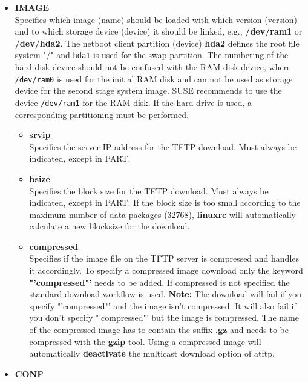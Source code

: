 \begin{itemize}
    \item \textbf{IMAGE}\\
        Specifies which image (name) should be loaded with which
        version (version) and to which storage device (device) it
        should be linked, e.g., \textbf{/dev/ram1} or
        \textbf{/dev/hda2}. The netboot client partition (device)
        \textbf{hda2} defines the root file system "/" and \texttt{hda1}
        is used for the swap partition. The numbering of the hard disk
        device should not be confused with the RAM disk device,
        where \texttt{/dev/ram0} is used for the initial RAM disk and
        can not be used as storage device for the second stage system image.
        SUSE recommends to use the device \texttt{/dev/ram1} for the
        RAM disk. If the hard drive is used, a corresponding partitioning
        must be performed.
        \begin{itemize}
        \item \textbf{srvip}\\
        Specifies the server IP address for the TFTP download.
        Must always be indicated, except in PART.
        \item \textbf{bsize}\\
        Specifies the block size for the TFTP download. Must always
        be indicated, except in PART. If the block size is too small
        according to the maximum number of data packages (32768),
        \textbf{linuxrc} will automatically calculate a new blocksize for
        the download.
        \item \textbf{compressed}\\
        Specifies if the image file on the TFTP server is compressed and
        handles it accordingly. To specify a compressed image download only
        the keyword \textbf{"'compressed"'} needs to be added. If compressed
        is not specified the standard download workflow is used. \textbf{Note:}
        The download will fail if you specify "'compressed"' and the image isn't
        compressed. It will also fail if you don't specify "'compressed"'
        but the image is compressed. The name of the compressed image has
        to contain the suffix \textbf{.gz} and needs to be compressed with the
        \textbf{gzip} tool. Using a compressed image will automatically
        \textbf{deactivate} the multicast download option of atftp.
    \end{itemize}
    \item \textbf{CONF}\\

\end{itemize}
